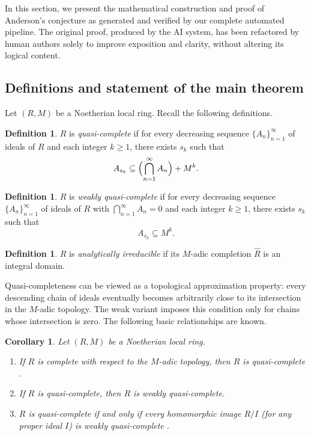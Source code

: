 \documentclass[]{pkuai4m}
\theoremstyle{plain}
\newtheorem{corollary}[theorem]{Corollary}
\theoremstyle{definition}
\newtheorem{definition}[theorem]{Definition}
\begin{document}
In this section, we present the mathematical construction and proof of Anderson’s conjecture as generated and verified by our complete automated pipeline. The original proof, produced by the AI system, has been refactored by human authors solely to improve exposition and clarity, without altering its logical content.

\subsection*{Definitions and statement of the main theorem}

Let $(R, M)$ be a Noetherian local ring. Recall the following definitions.

\begin{definition}
$R$ is \emph{quasi-complete} if for every decreasing sequence $\{A_n\}_{n=1}^{\infty}$ of ideals of $R$ and each integer $k \ge 1$, there exists $s_k$ such that 
\[
A_{s_k} \subseteq \Bigl(\bigcap_{n=1}^{\infty} A_n\Bigr) + M^k.
\]
\end{definition}

\begin{definition}
$R$ is \emph{weakly quasi-complete} if for every decreasing sequence $\{A_n\}_{n=1}^{\infty}$ of ideals of $R$ with $\bigcap_{n=1}^{\infty} A_n = 0$ and each integer $k \ge 1$, there exists $s_k$ such that 
\[
A_{s_k} \subseteq M^k.
\]
\end{definition}

\begin{definition}
$R$ is \emph{analytically irreducible} if its $M$-adic completion $\widehat{R}$ is an integral domain.
\end{definition}

Quasi-completeness can be viewed as a topological approximation property: every descending chain of ideals eventually becomes arbitrarily close to its intersection in the $M$-adic topology. The weak variant imposes this condition only for chains whose intersection is zero. The following basic relationships are known.

\begin{corollary}\label{cor:basic-relationships}
Let $(R, M)$ be a Noetherian local ring.
\begin{enumerate}[leftmargin=*]
\item If $R$ is complete with respect to the $M$-adic topology, then $R$ is quasi-complete \cite[Lemma 7]{chevalley1943theory}.
\item If $R$ is quasi-complete, then $R$ is weakly quasi-complete.
\item $R$ is quasi-complete if and only if every homomorphic image $R/I$ (for any proper ideal $I$) is weakly quasi-complete \cite[Theorem 1.3]{anderson2014quasi}.
\end{enumerate}
\end{corollary}
\end{document}
